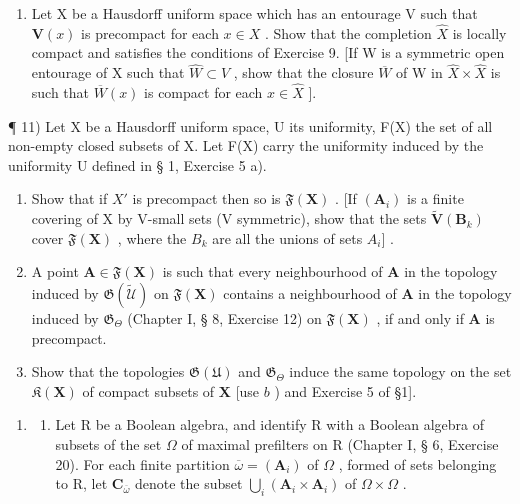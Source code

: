\begin{enumerate}
\def\labelenumi{\arabic{enumi})}
\setcounter{enumi}{9}
\tightlist
\item
  Let X be a Hausdorff uniform space which has an entourage V such that \(\mathbf{V}(x)\) is precompact for each \(x \in X\) . Show that the completion \(\hat{X}\) is locally compact and satisfies the conditions of Exercise 9. {[}If W is a symmetric open entourage of X such that \(\hat{W} \subset V\) , show that the closure \(\overline{W}\) of W in \(\hat{X} \times \hat{X}\) is such that \(\overline{W}(x)\) is compact for each \(x \in \hat{X}\) {]}.
\end{enumerate}

¶ 11) Let X be a Hausdorff uniform space, U its uniformity, F(X) the set of all non-empty closed subsets of X. Let F(X) carry the uniformity induced by the uniformity U defined in § 1, Exercise 5 a).

\begin{enumerate}
\def\labelenumi{\alph{enumi})}
\item
  Show that if \(X'\) is precompact then so is \(\mathfrak{F}(\mathbf{X})\) . {[}If \((\mathbf{A}_{i})\) is a finite covering of X by V-small sets (V symmetric), show that the sets \(\tilde{\mathbf{V}}(\mathbf{B}_{k})\) cover \(\mathfrak{F}(\mathbf{X})\) , where the \(B_{k}\) are all the unions of sets \(A_{i}]\) .
\item
  A point \(\mathbf{A} \in \mathfrak{F}(\mathbf{X})\) is such that every neighbourhood of \(\mathbf{A}\) in the topology induced by \(\mathfrak{G}(\tilde{\mathcal{U}})\) on \(\mathfrak{F}(\mathbf{X})\) contains a neighbourhood of \(\mathbf{A}\) in the topology induced by \(\mathfrak{G}_{\Theta}\) (Chapter I, § 8, Exercise 12) on \(\mathfrak{F}(\mathbf{X})\) , if and only if \(\mathbf{A}\) is precompact.
\item
  Show that the topologies \(\mathfrak{G}(\mathfrak{U})\) and \(\mathfrak{G}_{\Theta}\) induce the same topology on the set \(\mathfrak{K}(\mathbf{X})\) of compact subsets of \(\mathbf{X}\) {[}use \(b\) ) and Exercise 5 of §1{]}.
\end{enumerate}

\begin{enumerate}
\def\labelenumi{\arabic{enumi})}
\setcounter{enumi}{11}
\tightlist
\item
  \begin{enumerate}
  \def\labelenumii{\alph{enumii})}
  \tightlist
  \item
    Let R be a Boolean algebra, and identify R with a Boolean algebra of subsets of the set \(\Omega\) of maximal prefilters on R (Chapter I, § 6, Exercise 20). For each finite partition \(\overline{\omega} = (\mathbf{A}_i)\) of \(\Omega\) , formed of sets belonging to R, let \(\mathbf{C}_{\overline{\omega}}\) denote the subset \(\bigcup_{i} (\mathbf{A}_i \times \mathbf{A}_i)\) of \(\Omega \times \Omega\) .
  \end{enumerate}
\end{enumerate}

